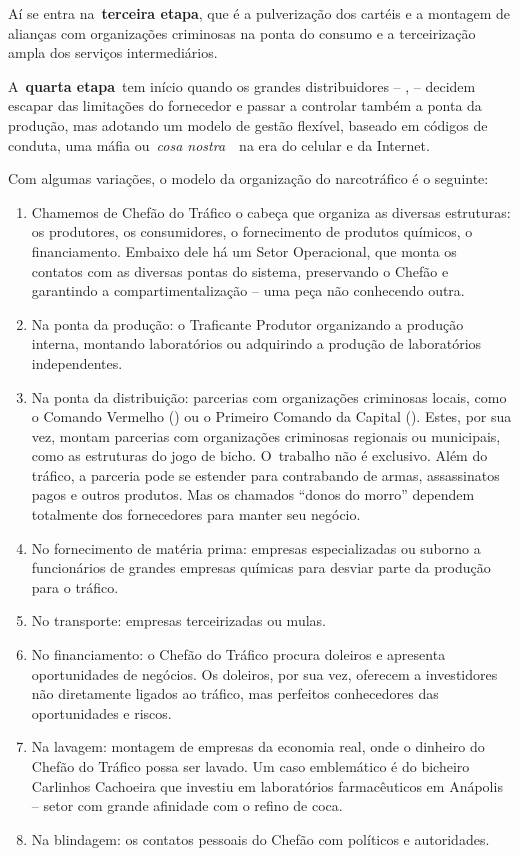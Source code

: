 Aí se entra na~\textbf{terceira etapa}, que é a pulverização dos cartéis
e a montagem de alianças com organizações criminosas na ponta do consumo
e a terceirização ampla dos serviços intermediários.

A~\textbf{quarta etapa}~tem início quando os grandes distribuidores --
,  -- decidem escapar das limitações do fornecedor e passar a
controlar também a ponta da produção, mas adotando um modelo de gestão
flexível, baseado em códigos de conduta, uma máfia ou~\emph{cosa
nostra}~~na era do celular e da Internet.

Com algumas variações, o modelo da organização do narcotráfico é o
seguinte:

 

\begin{enumerate}
\itemsep1pt\parskip0pt
\item
  Chamemos de Chefão do Tráfico o cabeça que organiza as diversas
  estruturas: os produtores, os consumidores, o fornecimento de produtos
  químicos, o financiamento. Embaixo dele há um Setor Operacional, que
  monta os contatos com as diversas pontas do sistema, preservando o
  Chefão e garantindo a compartimentalização -- uma peça não conhecendo
  outra.
\item
  Na ponta da produção: o Traficante Produtor organizando a produção
  interna, montando laboratórios ou adquirindo a produção de
  laboratórios independentes.
\item
  Na ponta da distribuição: parcerias com organizações criminosas
  locais, como o Comando Vermelho () ou o Primeiro Comando da Capital
  (). Estes, por sua vez, montam parcerias com organizações
  criminosas regionais ou municipais, como as estruturas do jogo de
  bicho. O~trabalho não é exclusivo. Além do tráfico, a parceria pode se
  estender para contrabando de armas, assassinatos pagos e outros
  produtos. Mas os chamados ``donos do morro'' dependem totalmente dos
  fornecedores para manter seu negócio.
\item
  No fornecimento de matéria prima: empresas especializadas ou suborno a
  funcionários de grandes empresas químicas para desviar parte da
  produção para o tráfico.
\item
  No transporte: empresas terceirizadas ou mulas.
\item
  No financiamento: o Chefão do Tráfico procura doleiros e apresenta
  oportunidades de negócios. Os doleiros, por sua vez, oferecem a
  investidores não diretamente ligados ao tráfico, mas perfeitos
  conhecedores das oportunidades e riscos.
\item
  Na lavagem: montagem de empresas da economia real, onde o dinheiro do
  Chefão do Tráfico possa ser lavado. Um caso emblemático é do bicheiro
  Carlinhos Cachoeira que investiu em laboratórios farmacêuticos em
  Anápolis -- setor com grande afinidade com o refino de coca.
\item
  Na blindagem: os contatos pessoais do Chefão com políticos e
  autoridades.
\end{enumerate}

